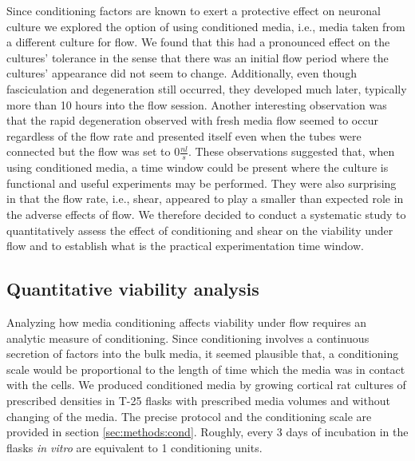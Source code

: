     Since conditioning factors are known to exert a protective effect on neuronal culture \cite{kaech2006culturing,banker1980trophic} we explored the option of using conditioned media, i.e., media taken from a different culture for flow. We found that this had a pronounced effect on the cultures' tolerance in the sense that there was an initial flow period where the cultures' appearance did not seem to change. Additionally, even though fasciculation and degeneration still occurred, they developed much later, typically more than 10 hours into the flow session. Another interesting observation was that the rapid degeneration observed with fresh media flow seemed to occur regardless of the flow rate and presented itself even when the tubes were connected but the flow was set to \(0 \frac{nl}{s}\). These observations suggested that, when using conditioned media, a time window could be present where the culture is functional and useful experiments may be performed. They were also surprising in that the flow rate, i.e., shear, appeared to play a smaller than expected role in the adverse effects of flow. We therefore decided to conduct a systematic study to quantitatively assess the effect of conditioning and shear on the viability under flow and to establish what is the practical experimentation time window.


    \subsection{Quantitative viability analysis}
    \label{sec:devices:viabilityAssay}
    Analyzing how media conditioning affects viability under flow requires an analytic measure of conditioning. Since conditioning involves a continuous secretion of factors into the bulk media, it seemed plausible that, a conditioning scale would be proportional to the length of time which the media was in contact with the cells. We produced conditioned media by growing cortical rat cultures of prescribed densities in T-25 flasks with prescribed media volumes and without changing of the media. The precise protocol and the conditioning scale are provided in section \ref{sec:methods:cond}. Roughly, every 3 days of incubation in the flasks \textit{in vitro} are equivalent to 1 conditioning units.

